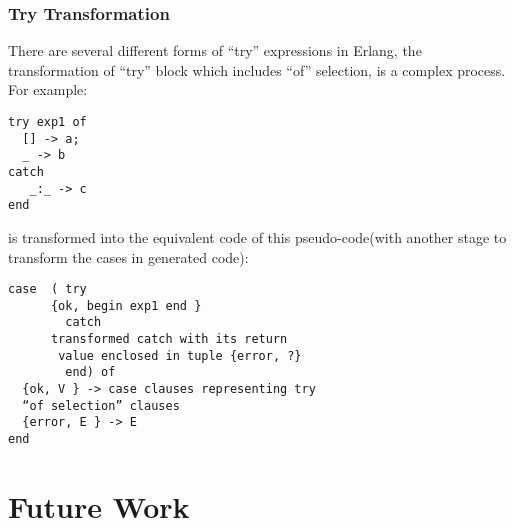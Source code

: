 \documentclass[12pt,a4paper]{report}
\begin{document}
\subsection{Try Transformation}
There are several different forms of “try” expressions in Erlang, the transformation of “try” block which includes “of” selection, is a complex process. For example:
\begin{lstlisting}
try exp1 of 
  [] -> a;
  _ -> b
catch
   _:_ -> c
end
\end{lstlisting}

is transformed into the equivalent code of this pseudo-code(with another stage to transform the cases in generated code):

\begin{lstlisting}
case  ( try
	  {ok, begin exp1 end }
        catch        
	  transformed catch with its return
	   value enclosed in tuple {error, ?}
        end) of
  {ok, V } -> case clauses representing try
  “of selection” clauses
  {error, E } -> E
end
\end{lstlisting}
\chapter{Future Work}
\newpage


\end{document}
